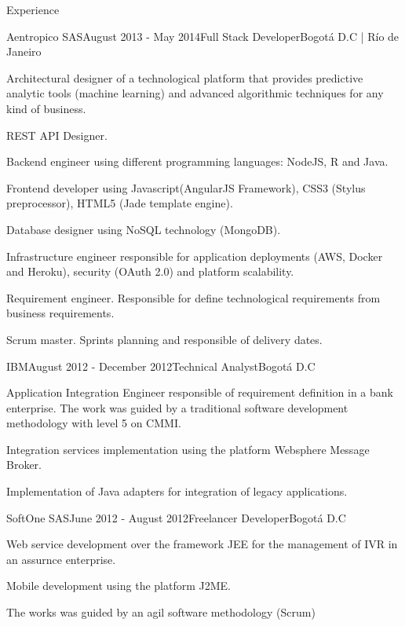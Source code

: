 \documentclass[spanish]{resume}
\begin{document}
\begin{rSection}{Experience}

\begin{rSubsection}{Aentropico SAS}{August 2013 - May 2014}{Full Stack Developer}{Bogot\'a D.C | R\'io de Janeiro}
\item Architectural designer of a technological platform that provides predictive analytic tools (machine learning) and advanced algorithmic techniques for any kind of business.
\item REST API Designer.
\item Backend engineer using different programming languages: NodeJS, R and Java.
\item Frontend developer using Javascript(AngularJS Framework), CSS3 (Stylus preprocessor), HTML5 (Jade template engine).
\item Database designer using NoSQL technology (MongoDB).
\item Infrastructure engineer responsible for application deployments (AWS, Docker and Heroku), security (OAuth 2.0) and platform scalability.
\item Requirement engineer. Responsible for define technological requirements from business requirements.
\item Scrum master. Sprints planning and responsible of delivery dates.
\end{rSubsection}


\begin{rSubsection}{IBM}{August 2012 - December 2012}{Technical Analyst}{Bogot\'a D.C}
\item Application Integration Engineer responsible of requirement definition in a bank enterprise. The work was guided by a traditional software development methodology with level 5 on CMMI.
\item Integration services implementation using the platform Websphere Message Broker.
\item Implementation of Java adapters for integration of legacy applications.
\end{rSubsection}


\begin{rSubsection}{SoftOne SAS}{June 2012 - August 2012}{Freelancer Developer}{Bogot\'a D.C}
\item Web service development over the framework JEE for the management of IVR in an assurnce enterprise.
\item Mobile development using the platform J2ME.
\item The works was guided by an agil software methodology (Scrum)
\end{rSubsection}

\end{rSection}
\end{document}
